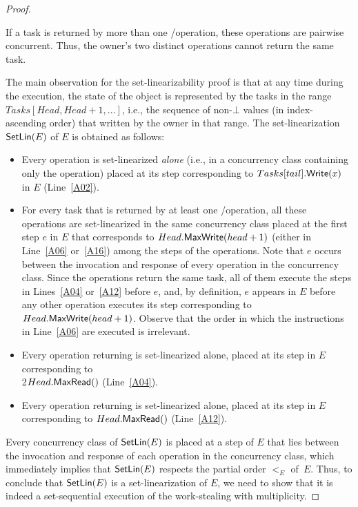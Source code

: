 \begin{proof}
\begin{remark}\label{remark-concurrency}
If a task is returned by more than one \Take/\Steal operation, these operations are pairwise concurrent.  Thus, the owner's two distinct \Take operations cannot return the same task.
\end{remark}


The main observation for the set-linearizability proof is that at any time during the execution, the state of the object is represented by the tasks in the range \(Tasks[Head, Head+1, \hdots ]\), i.e., the sequence of non-\(\bot\) values (in index-ascending order) that written by the owner in that range. The set-linearization \({\sf \small SetLin}(E)\) of \(E\) is obtained as follows:

\begin{itemize}

\item Every \Put operation is set-linearized \emph{alone} (i.e., in a concurrency class containing only the operation) placed at its step corresponding to \(Tasks[tail].{\sf \small Write}(x)\) in \(E\) (Line~\ref{A02}).

\item For every task that is returned by at least one \Take/\Steal operation, all these operations are set-linearized in the same concurrency class placed at the first step \(e\) in \(E\) that corresponds to \(Head.{\sf \small MaxWrite}(head+1)\) (either in Line~\ref{A06} or~\ref{A16}) among the steps of the operations.  Note that \(e\) occurs between the invocation and response of every operation in the concurrency class. Since the operations return the same task, all of them execute the \MaxR steps in Lines~\ref{A04} or~\ref{A12} before \(e\), and, by definition, \(e\) appears in \(E\) before any other operation executes its step corresponding to \(Head.{\sf \small MaxWrite}(head+1)\).  Observe that the order in which the instructions in Line~\ref{A06} are executed is irrelevant.

\item Every \Take operation returning \epty is set-linearized alone, placed at its step in \(E\) corresponding to\\2\(Head.{\sf \small MaxRead}()\) (Line~\ref{A04}).

\item Every \Steal operation returning \epty is set-linearized alone, placed at its step in \(E\) corresponding to \(Head.{\sf \small MaxRead}()\) (Line~\ref{A12}).

\end{itemize}

Every concurrency class of \({\sf \small SetLin}(E)\) is placed at a step of \(E\) that lies between the invocation and response of each operation in the concurrency class, which immediately implies that \({\sf \small SetLin}(E)\) respects the partial order \(<_E\) of~\(E\). Thus, to conclude that \({\sf \small SetLin}(E)\) is a set-linearization of \(E\), we need to show that it is indeed a set-sequential execution of the work-stealing with multiplicity.


\end{proof}
